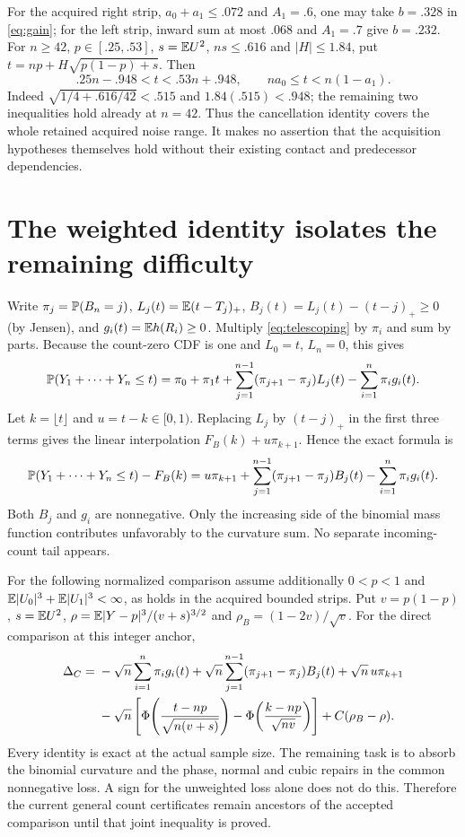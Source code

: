 \documentclass[11pt]{article}
\begin{document}
For the acquired right strip, $a_0+a_1\le.072$ and $A_1=.6$, one may
take $b=.328$ in \eqref{eq:gain}; for the left strip, inward sum at most
$.068$ and $A_1=.7$ give $b=.232$. For $n\ge42$, $p\in[.25,.53]$,
$s=\mathbb E U^2$, $ns\le.616$ and $|H|\le1.84$, put
$t=np+H\sqrt{p(1-p)+s}$. Then
\[
 .25n-.948<t<.53n+.948,\qquad
                   na_0\le t<n(1-a_1).
\]
Indeed $\sqrt{1/4+.616/42}<.515$ and $1.84(.515)<.948$;
the remaining two inequalities hold already at $n=42$. Thus the
cancellation identity covers the whole retained acquired noise range.
It makes no assertion that the acquisition hypotheses themselves hold
without their existing contact and predecessor dependencies.

\section*{The weighted identity isolates the remaining difficulty}
Write $\pi_j=\mathbb P(B_n=j)$, $L_j(t)=\mathbb E(t-T_j)_+$,
$B_j(t)=L_j(t)-(t-j)_+\ge0$ (by Jensen), and
$g_i(t)=\mathbb E h(R_i)\ge0$. Multiply \eqref{eq:telescoping} by $\pi_i$ and sum by parts.
Because the count-zero CDF is one and $L_0=t$, $L_n=0$, this gives
\begin{equation}\label{eq:parts}
 \mathbb P(Y_1+\cdots+Y_n\le t)
 =\pi_0+\pi_1t+\sum_{j=1}^{n-1}(\pi_{j+1}-\pi_j)L_j(t)
                 -\sum_{i=1}^n\pi_i g_i(t).
\end{equation}
Let $k=\lfloor t\rfloor$ and $u=t-k\in[0,1)$. Replacing $L_j$ by
$(t-j)_+$ in the first three terms gives the linear interpolation
$F_B(k)+u\pi_{k+1}$. Hence the exact formula is
\begin{equation}\label{eq:weighted}
 \mathbb P(Y_1+\cdots+Y_n\le t)-F_B(k)
 =u\pi_{k+1}+\sum_{j=1}^{n-1}(\pi_{j+1}-\pi_j)B_j(t)
                 -\sum_{i=1}^n\pi_i g_i(t).
\end{equation}
Both $B_j$ and $g_i$ are nonnegative. Only the increasing side of the
binomial mass function contributes unfavorably to the curvature sum.
No separate incoming-count tail appears.

For the following normalized comparison assume additionally $0<p<1$
and $\mathbb E|U_0|^3+\mathbb E|U_1|^3<\infty$, as holds in the acquired bounded
strips. Put $v=p(1-p)$, $s=\mathbb E U^2$,
$\rho=\mathbb E|Y-p|^3/(v+s)^{3/2}$ and $\rho_B=(1-2v)/\sqrt v$.
For the direct comparison at this integer anchor,
\begin{align}\label{eq:delta}
 \Delta_C={}&-\sqrt n\sum_{i=1}^n\pi_i g_i(t)
       +\sqrt n\sum_{j=1}^{n-1}(\pi_{j+1}-\pi_j)B_j(t)
       +\sqrt n\,u\pi_{k+1}\notag\\
 &-\sqrt n\left[
 \Phi\!\left(\frac{t-np}{\sqrt{n(v+s)}}\right)
 -\Phi\!\left(\frac{k-np}{\sqrt{nv}}\right)\right]
                  +C(\rho_B-\rho).
\end{align}
Every identity is exact at the actual sample size. The remaining task is
to absorb the binomial curvature and the phase, normal and cubic repairs
in the common nonnegative loss. A sign for the unweighted loss alone does
not do this. Therefore the current general count certificates remain
ancestors of the accepted comparison until that joint inequality is proved.
\end{document}
